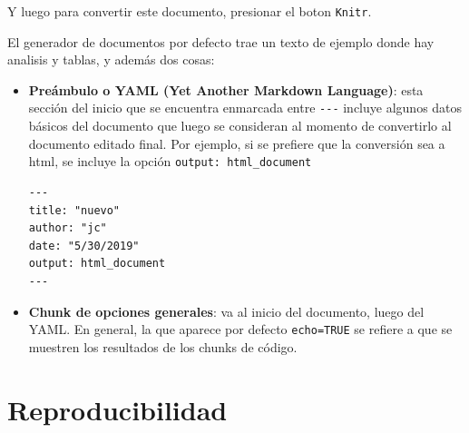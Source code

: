 \documentclass[11pt,]{book}
\begin{document}
Y luego para convertir este documento, presionar el boton \texttt{Knitr}.

El generador de documentos por defecto trae un texto de ejemplo donde hay analisis y tablas, y además dos cosas:

\begin{itemize}
\item
  \textbf{Preámbulo o YAML (Yet Another Markdown Language)}: esta sección del inicio que se encuentra enmarcada entre \texttt{-\/-\/-} incluye algunos datos básicos del documento que luego se consideran al momento de convertirlo al documento editado final. Por ejemplo, si se prefiere que la conversión sea a html, se incluye la opción \texttt{output:\ html\_document}

\begin{verbatim}
---
title: "nuevo"
author: "jc"
date: "5/30/2019"
output: html_document
---
\end{verbatim}
\item
  \textbf{Chunk de opciones generales}: va al inicio del documento, luego del YAML. En general, la que aparece por defecto \texttt{echo=TRUE} se refiere a que se muestren los resultados de los chunks de código.
\end{itemize}

\hypertarget{reproducibilidad-1}{%
\section{Reproducibilidad}\label{reproducibilidad-1}}


\end{document}
